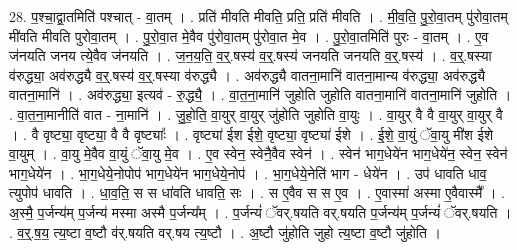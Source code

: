 \documentclass[17pt]{extarticle}
\begin{document}
28. प॒श्चा॒द्वा॒तमिति॑ पश्चात् - वा॒तम् । . प्रति॑ मीवति मीवति॒ प्रति॒ प्रति॑ मीवति । . मी॒व॒ति॒ पु॒रो॒वा॒तम् पु॑रोवा॒तम् मी॑वति मीवति पुरोवा॒तम् । . पु॒रो॒वा॒त मे॒वैव पु॑रोवा॒तम् पु॑रोवा॒त मे॒व । . पु॒रो॒वा॒तमिति॑ पुरः - वा॒तम् । . ए॒व ज॑नयति जनय त्ये॒वैव ज॑नयति । . ज॒न॒य॒ति॒ व॒र्॒.षस्य॑ व॒र्॒.षस्य॑ जनयति जनयति व॒र्॒.षस्य॑ । . व॒र्॒.षस्या व॑रुद्ध्या॒ अव॑रुद्ध्यै व॒र्॒.षस्य॑ व॒र्॒.षस्या व॑रुद्ध्यै । . अव॑रुद्ध्यै वातना॒मानि॑ वातना॒मान्य व॑रुद्ध्या॒ अव॑रुद्ध्यै वातना॒मानि॑ । . अव॑रुद्ध्या॒ इत्यव॑ - रु॒द्ध्यै॒ । . वा॒त॒ना॒मानि॑ जुहोति जुहोति वातना॒मानि॑ वातना॒मानि॑ जुहोति । . वा॒त॒ना॒मानीति॑ वात - ना॒मानि॑ । . जु॒हो॒ति॒ वा॒युर् वा॒युर् जु॑होति जुहोति वा॒युः । . वा॒युर् वै वै वा॒युर् वा॒युर् वै । . वै वृष्ट्या॒ वृष्ट्या॒ वै वै वृष्ट्याः᳚ । . वृष्ट्या॑ ईश ईशे॒ वृष्ट्या॒ वृष्ट्या॑ ईशे । . ई॒शे॒ वा॒युं ॅवा॒यु मी॑श ईशे वा॒युम् । . वा॒यु मे॒वैव वा॒युं ॅवा॒यु मे॒व । . ए॒व स्वेन॒ स्वेनै॒वैव स्वेन॑ । . स्वेन॑ भाग॒धेये॑न भाग॒धेये॑न॒ स्वेन॒ स्वेन॑ भाग॒धेये॑न । . भा॒ग॒धेये॒नोपोप॑ भाग॒धेये॑न भाग॒धेये॒नोप॑ । . भा॒ग॒धेये॒नेति॑ भाग - धेये॑न । . उप॑ धावति धाव॒ त्युपोप॑ धावति । . धा॒व॒ति॒ स स धा॑वति धावति॒ सः । . स ए॒वैव स स ए॒व । . ए॒वास्मा॑ अस्मा ए॒वैवास्मै᳚ । . अ॒स्मै॒ प॒र्जन्य॑म् प॒र्जन्य॑ मस्मा अस्मै प॒र्जन्य᳚म् । . प॒र्जन्यं॑ ॅवर्.षयति वर्.षयति प॒र्जन्य॑म् प॒र्जन्यं॑ ॅवर्.षयति । . व॒र्॒.ष॒य॒ त्य॒ष्टा व॒ष्टौ व॑र्.षयति वर्.षय त्य॒ष्टौ । . अ॒ष्टौ जु॑होति जुहो त्य॒ष्टा व॒ष्टौ जु॑होति । \newline
\end{document}
